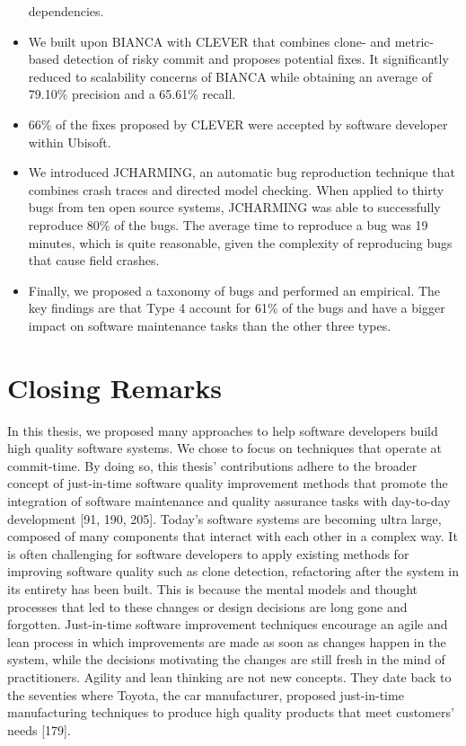 \documentclass[12pt]{report}
\begin{document}
\begin{itemize}
  dependencies.
\item
  We built upon BIANCA with CLEVER that combines clone- and metric-based
  detection of risky commit and proposes potential fixes. It
  significantly reduced to scalability concerns of BIANCA while
  obtaining an average of 79.10\% precision and a 65.61\% recall.
\item
  66\% of the fixes proposed by CLEVER were accepted by software
  developer within Ubisoft.
\item
  We introduced JCHARMING, an automatic bug reproduction technique that
  combines crash traces and directed model checking. When applied to
  thirty bugs from ten open source systems, JCHARMING was able to
  successfully reproduce 80\% of the bugs. The average time to reproduce
  a bug was 19 minutes, which is quite reasonable, given the complexity
  of reproducing bugs that cause field crashes.
\item
  Finally, we proposed a taxonomy of bugs and performed an empirical.
  The key findings are that Type 4 account for 61\% of the bugs and have
  a bigger impact on software maintenance tasks than the other three
  types.
\end{itemize}

\section{Closing Remarks}\label{closing-remarks}

In this thesis, we proposed many approaches to help software developers
build high quality software systems. We chose to focus on techniques
that operate at commit-time. By doing so, this thesis' contributions
adhere to the broader concept of just-in-time software quality
improvement methods that promote the integration of software maintenance
and quality assurance tasks with day-to-day development {[}91, 190,
205{]}. Today's software systems are becoming ultra large, composed of
many components that interact with each other in a complex way. It is
often challenging for software developers to apply existing methods for
improving software quality such as clone detection, refactoring after
the system in its entirety has been built. This is because the mental
models and thought processes that led to these changes or design
decisions are long gone and forgotten. Just-in-time software improvement
techniques encourage an agile and lean process in which improvements are
made as soon as changes happen in the system, while the decisions
motivating the changes are still fresh in the mind of practitioners.
Agility and lean thinking are not new concepts. They date back to the
seventies where Toyota, the car manufacturer, proposed just-in-time
manufacturing techniques to produce high quality products that meet
customers' needs {[}179{]}.
\end{document}
